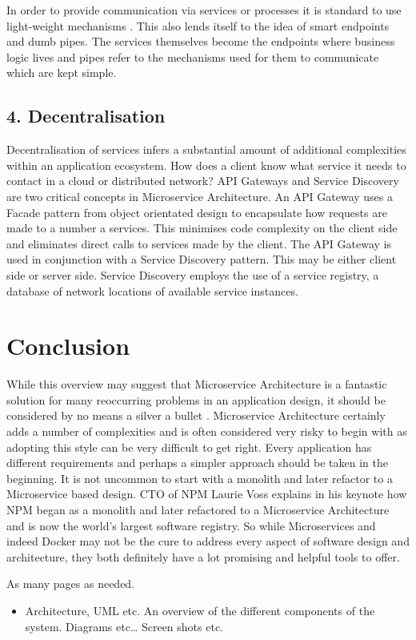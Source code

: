 In order to provide communication via services or processes it is standard to use light-weight mechanisms \cite{MicroservicesYesterdayTodayTomorrow}. This also lends itself to the idea of smart endpoints and dumb pipes\cite{MicroservicesResourceGuide}. The services themselves become the endpoints where business logic lives and pipes refer to the mechanisms used for them to communicate which are kept simple.

\subsection*{ 4. Decentralisation }
Decentralisation of services infers a substantial amount of additional complexities within an application ecosystem. How does a client know what service it needs to contact in a cloud or distributed network? API Gateways\cite{APIGateways} and Service Discovery\cite{ServiceDiscovery} are two critical concepts in Microservice Architecture. An API Gateway uses a Facade pattern\cite{Gamma:1995:DPE:186897} from object orientated design to encapsulate how requests are made to a number a services. This minimises code complexity on the client side and eliminates direct calls to services made by the client. The API Gateway is used in conjunction with a Service Discovery pattern. This may be either client side or server side. Service Discovery employs the use of a service registry, a database of network locations of available service instances\cite{ServiceDiscovery}.

\section{Conclusion}
While this overview may suggest that Microservice Architecture is a fantastic solution for many reoccurring problems in an application design, it should be considered by no means a silver a bullet \cite{BuildingMicroServices}. Microservice Architecture certainly adds a number of complexities and is often considered very risky to begin with as adopting this style can be very difficult to get right. Every application has different requirements and perhaps a simpler approach should be taken in the beginning. It is not uncommon to start with a monolith and later refactor to a Microservice based design. CTO of NPM Laurie Voss explains in his keynote how NPM began as a monolith and later refactored to a Microservice Architecture and is now the world's largest software registry\cite{npm}. So while Microservices and indeed Docker may not be the cure to address every aspect of software design and architecture, they both definitely have a lot promising and helpful tools to offer.

As many pages as needed.
\begin{itemize}
\item Architecture, UML etc. An overview of the different components of the system. Diagrams etc… Screen shots etc.
\end{itemize}

